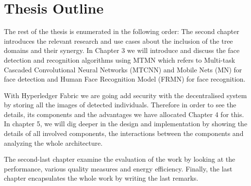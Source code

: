 \section{Thesis Outline}
The rest of the thesis is enumerated in the following order: The second chapter introduces the relevant research and use cases about the inclusion of the tree domains and their synergy. In Chapter 3 we will introduce and discuss the face detection and recognition algorithms using MTMN which refers to Multi-task Cascaded Convolutional Neural Networks (MTCNN) and Mobile Nets (MN) for face detection and Human Face Recognition Model (FRMN) for face recognition. 

With Hyperledger Fabric we are going add security with the decentralised system by storing all the images of detected individuals. Therefore in order to see the details, its components and the advantages we have allocated Chapter 4 for this. In chapter 5, we will dig deeper in the design and implementation by showing the details of all involved components, the interactions between the components and analyzing the whole architecture. 


The second-last chapter examine the evaluation of the work by looking at the performance, various quality measures and energy efficiency. Finally, the last chapter encapsulates the whole work by writing the last remarks.




